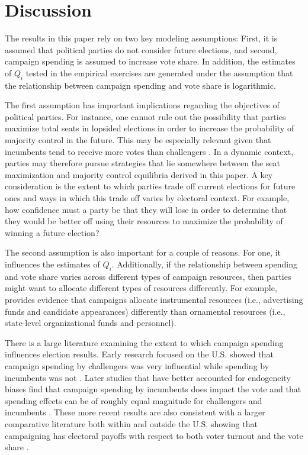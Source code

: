 \documentclass[12pt,final,fleqn]{article}
\theoremstyle{plain}
\begin{document}
\section{Discussion} \label{sec:discussion}
The results in this paper rely on two key modeling assumptions: First, it is assumed that political parties do not consider future elections, and second, campaign spending is assumed to increase vote share. In addition, the estimates of $Q_i$ tested in the empirical exercises are generated under the assumption that the relationship between campaign spending and vote share is logarithmic.

The first assumption has important implications regarding the objectives of political parties. For instance, one cannot rule out the possibility that parties maximize total seats in lopsided elections in order to increase the probability of majority control in the future. This may be especially relevant given that incumbents tend to receive more votes than challengers \citep{ansolabehere2002incumbency,gelman1990estimating, gelman2008estimating, lee2001electoral}.  In a dynamic context, parties may therefore pursue strategies that lie somewhere between the seat maximization and majority control equilibria derived in this paper. A key consideration is the extent to which parties trade off current elections for future ones and ways in which this trade off varies by electoral context. For example, how confidence must a party be that they will lose in order to determine that they would be better off using their resources to maximize the probability of winning a future election?

The second assumption is also important for a couple of reasons. For one, it influences the estimates of $Q_i$. Additionally, if the relationship between spending and vote share varies across different types of campaign resources, then parties might want to allocate different types of resources differently. For example, \citet{bartels1985resource} provides evidence that campaigns allocate instrumental resources (i.e., advertising funds and candidate appearances) differently than ornamental resources (i.e., state-level organizational funds and personnel).  

There is a large literature examining the extent to which campaign spending influences election results. Early research focused on the U.S. showed that campaign spending by challengers was very influential while spending by incumbents was not \citep{jacobson1978effects, jacobson1980money,jacobson1985money}. Later studies that have better accounted for endogeneity biases find that campaign spending by incumbents does impact the vote and that spending effects can be of roughly equal magnitude for challengers and incumbents \citep{erikson2000equilibria, gerber1998estimating, green1988salvation}. These more recent results are also consistent with a larger comparative literature both within and outside the U.S. showing that campaigning has electoral payoffs with respect to both voter turnout and the vote share \citep[e.g.,][]{denver2003constituency, gerber2000effects, hillygus2005campaign, pattie1995winning,marsh2004none, whiteley2003win}. 
\end{document}
